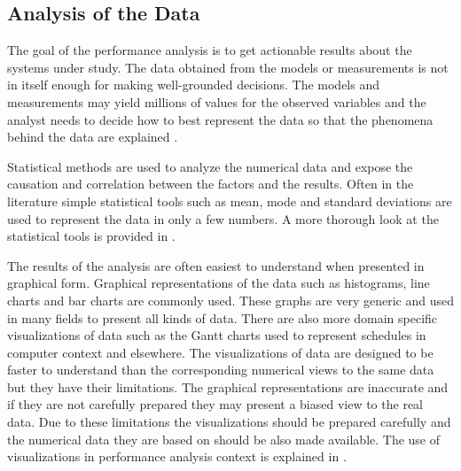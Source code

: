 \subsection{Analysis of the Data}
The goal of the performance analysis is to get actionable results about the
systems under study. The data obtained from the models or measurements is not in
itself enough for making well-grounded decisions. The models and measurements
may yield millions of values for the observed variables and the analyst needs to
decide how to best represent the data so that the phenomena behind the data are
explained \cite{jain1991art}.

Statistical methods are used to analyze the numerical data and expose the
causation and correlation between the factors and the results. Often in the
literature simple statistical tools such as mean, mode and standard deviations
are used to represent the data in only a few numbers. A more thorough look at
the statistical tools is provided in \cite{jain1991art}. 

The results of the analysis are often easiest to understand when presented in
graphical form. Graphical representations of the data such as histograms, line
charts and bar charts are commonly used. These graphs are very generic and used
in many fields to present all kinds of data. There are also more domain specific
visualizations of data such as the Gantt charts used to represent schedules in
computer context and elsewhere. The visualizations of data are designed to be
faster to understand than the corresponding numerical views to the same data but
they have their limitations. The graphical representations are inaccurate and if
they are not carefully prepared they may present a biased view to the real data.
Due to these limitations the visualizations should be prepared carefully and the
numerical data they are based on should be also made available. The use of
visualizations in performance analysis context is explained in
\cite{jain1991art}. 


